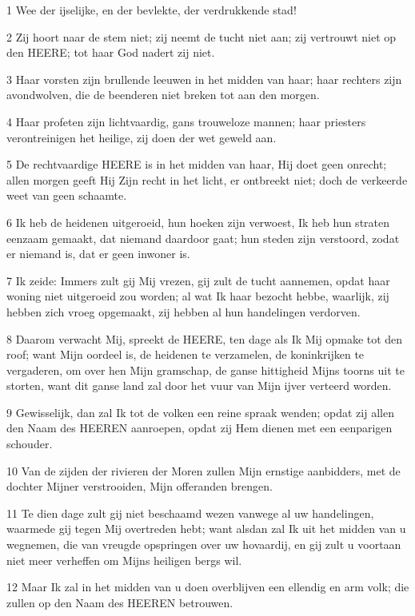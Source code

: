 \par 1 Wee der ijselijke, en der bevlekte, der verdrukkende stad!
\par 2 Zij hoort naar de stem niet; zij neemt de tucht niet aan; zij vertrouwt niet op den HEERE; tot haar God nadert zij niet.
\par 3 Haar vorsten zijn brullende leeuwen in het midden van haar; haar rechters zijn avondwolven, die de beenderen niet breken tot aan den morgen.
\par 4 Haar profeten zijn lichtvaardig, gans trouweloze mannen; haar priesters verontreinigen het heilige, zij doen der wet geweld aan.
\par 5 De rechtvaardige HEERE is in het midden van haar, Hij doet geen onrecht; allen morgen geeft Hij Zijn recht in het licht, er ontbreekt niet; doch de verkeerde weet van geen schaamte.
\par 6 Ik heb de heidenen uitgeroeid, hun hoeken zijn verwoest, Ik heb hun straten eenzaam gemaakt, dat niemand daardoor gaat; hun steden zijn verstoord, zodat er niemand is, dat er geen inwoner is.
\par 7 Ik zeide: Immers zult gij Mij vrezen, gij zult de tucht aannemen, opdat haar woning niet uitgeroeid zou worden; al wat Ik haar bezocht hebbe, waarlijk, zij hebben zich vroeg opgemaakt, zij hebben al hun handelingen verdorven.
\par 8 Daarom verwacht Mij, spreekt de HEERE, ten dage als Ik Mij opmake tot den roof; want Mijn oordeel is, de heidenen te verzamelen, de koninkrijken te vergaderen, om over hen Mijn gramschap, de ganse hittigheid Mijns toorns uit te storten, want dit ganse land zal door het vuur van Mijn ijver verteerd worden.
\par 9 Gewisselijk, dan zal Ik tot de volken een reine spraak wenden; opdat zij allen den Naam des HEEREN aanroepen, opdat zij Hem dienen met een eenparigen schouder.
\par 10 Van de zijden der rivieren der Moren zullen Mijn ernstige aanbidders, met de dochter Mijner verstrooiden, Mijn offeranden brengen.
\par 11 Te dien dage zult gij niet beschaamd wezen vanwege al uw handelingen, waarmede gij tegen Mij overtreden hebt; want alsdan zal Ik uit het midden van u wegnemen, die van vreugde opspringen over uw hovaardij, en gij zult u voortaan niet meer verheffen om Mijns heiligen bergs wil.
\par 12 Maar Ik zal in het midden van u doen overblijven een ellendig en arm volk; die zullen op den Naam des HEEREN betrouwen.
